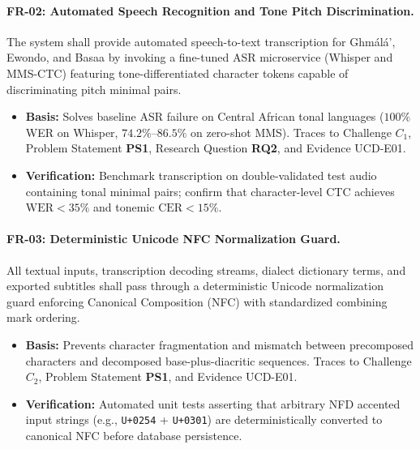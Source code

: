 \documentclass[a4paper,11pt]{article}
\begin{document}
\paragraph{FR-02: Automated Speech Recognition and Tone Pitch Discrimination.}
The system shall provide automated speech-to-text transcription for Gh\textopeno m\'al\'a', Ewondo, and Basaa by invoking a fine-tuned ASR microservice (Whisper and MMS-CTC) featuring tone-differentiated character tokens capable of discriminating pitch minimal pairs.
\begin{itemize}
    \item \textbf{Basis:} Solves baseline ASR failure on Central African tonal languages ($100\%$ WER on Whisper, $74.2\%\text{--}86.5\%$ on zero-shot MMS). Traces to Challenge $C_1$, Problem Statement \textbf{PS1}, Research Question \textbf{RQ2}, and Evidence UCD-E01.
    \item \textbf{Verification:} Benchmark transcription on double-validated test audio containing tonal minimal pairs; confirm that character-level CTC achieves $\text{WER} < 35\%$ and tonemic $\text{CER} < 15\%$.
\end{itemize}

\paragraph{FR-03: Deterministic Unicode NFC Normalization Guard.}
All textual inputs, transcription decoding streams, dialect dictionary terms, and exported subtitles shall pass through a deterministic Unicode normalization guard enforcing Canonical Composition (NFC) with standardized combining mark ordering.
\begin{itemize}
    \item \textbf{Basis:} Prevents character fragmentation and mismatch between precomposed characters and decomposed base-plus-diacritic sequences. Traces to Challenge $C_2$, Problem Statement \textbf{PS1}, and Evidence UCD-E01.
    \item \textbf{Verification:} Automated unit tests asserting that arbitrary NFD accented input strings (e.g., \texttt{U+0254} + \texttt{U+0301}) are deterministically converted to canonical NFC before database persistence.
\end{itemize}
\end{document}
